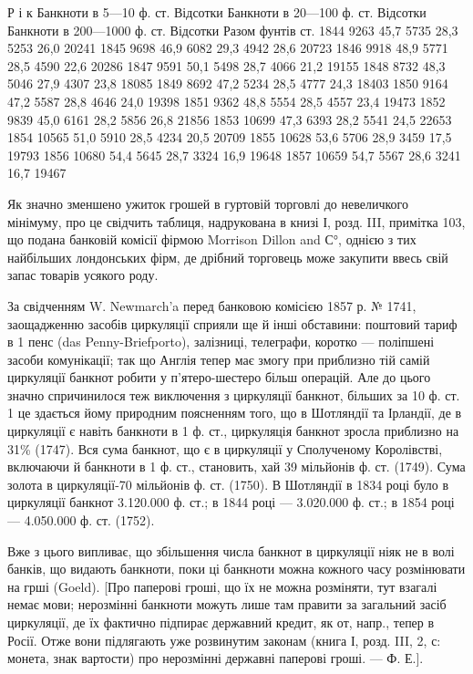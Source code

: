Р і к    Банкноти в 5—10 ф. ст. Відсотки    Банкноти в 20—100 ф. ст. Відсотки    Банкноти в 200—1000
ф. ст. Відсотки    Разом  фунтів  ст.
1844         9263    45,7    5735    28,3    5253    26,0    20241
1845         9698    46,9    6082    29,3    4942    28,6    20723
1846         9918    48,9    5771    28,5    4590    22,6    20286
1847         9591    50,1    5498    28,7    4066    21,2    19155
1848         8732    48,3    5046    27,9    4307    23,8    18085
1849         8692    47,2    5234    28,5    4777    24,3    18403
1850         9164    47,2    5587    28,8    4646    24,0    19398
1851        9362    48,8    5554    28,5    4557    23,4    19473
1852        9839    45,0    6161    28,2    5856    26,8    21856
1853         10699    47,3    6393    28,2    5541    24,5    22653
1854         10565    51,0    5910    28,5    4234    20,5       20709
1855         10628    53,6    5706    28,9    3459    17,5    19793
1856         10680    54,4    5645    28,7    3324    16,9    19648
1857         10659    54,7    5567    28,6    3241    16,7    19467

Як значно зменшено ужиток грошей в гуртовій торговлі до невеличкого
мінімуму, про це свідчить таблиця, надрукована в книзі І, розд. III, примітка 103,
що подана банковій комісії фірмою Morrison Dillon and С°, однією з тих найбільших
лондонських фірм, де дрібний торговець може закупити ввесь свій запас
товарів усякого роду.

За свідченням W. Newmarch’a перед банковою комісією 1857 р. № 1741,
заощадженню засобів циркуляції сприяли ще й інші обставини: поштовий тариф
в 1 пенс (das Penny-Briefporto), залізниці, телеграфи, коротко — поліпшені засоби
комунікації; так що Англія тепер має змогу при приблизно тій самій циркуляції
банкнот робити у п’ятеро-шестеро більш операцій. Але до цього значно
спричинилося теж виключення з циркуляції банкнот, більших за 10 ф. ст. 1 це
здається йому природним поясненням того, що в Шотляндії та Ірландії, де в
циркуляції є навіть банкноти в 1 ф. ст., циркуляція банкнот зросла приблизно
на 31\% (1747). Вся сума банкнот, що є в циркуляції у Сполученому Королівстві,
включаючи й банкноти в 1 ф. ст., становить, хай 39 мільйонів ф. ст.
(1749). Сума золота в циркуляції-70 мільйонів ф. ст. (1750). В Шотляндії
в 1834 році було в циркуляції банкнот 3.120.000 ф. ст.; в 1844 році —
3.020.000 ф. ст.; в 1854 році — 4.050.000 ф. ст. (1752).

Вже з цього випливає, що збільшення числа банкнот в циркуляції ніяк
не в волі банків, що видають банкноти, поки ці банкноти можна кожного часу
розмінювати на грші (Goeld). [Про паперові гроші, що їх не можна розміняти,
тут взагалі немає мови; нерозмінні банкноти можуть лише там правити за загальний
засіб циркуляції, де їх фактично підпирає державний кредит, як от, напр., тепер
в Росії. Отже вони підлягають уже розвинутим законам (книга І, розд. III, 2, с:
монета, знак вартости) про нерозмінні державні паперові гроші. — Ф. Е.].

